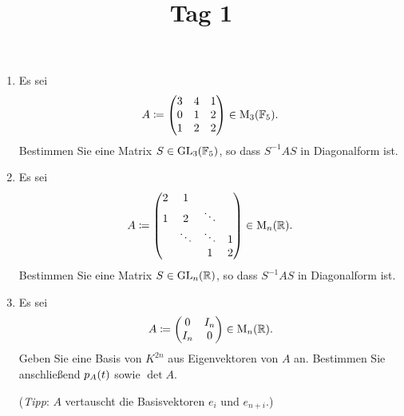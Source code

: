 \documentclass[a4paper, 10pt]{scrartcl}
\title{Tag 1}
\author{}
\date{}
\begin{document}
\begin{question}[subtitle = Diagonalisieren]
  \begin{enumerate}
    \item
      Es sei
      \[
                  A
        \coloneqq \begin{pmatrix}
                    3 & 4 & 1 \\
                    0 & 1 & 2 \\
                    1 & 2 & 2
                  \end{pmatrix}
        \in       \operatorname{M}_{3}(\mathbb{F}_5).
      \]
      Bestimmen Sie eine Matrix $S \in \operatorname{GL}_{3}(\mathbb{F}_5)$, so dass $S^{-1} A S$ in Diagonalform ist.
    \item
      Es sei
      \[
                  A
        \coloneqq \begin{pmatrix}
                    2 & 1       &         &   \\
                    1 & 2       & \ddots  &   \\
                      & \ddots  & \ddots  & 1 \\
                      &         & 1       & 2
                  \end{pmatrix}
        \in       \operatorname{M}_{n}(\mathbb{R}).
      \]
      Bestimmen Sie eine Matrix $S \in \operatorname{GL}_{n}(\mathbb{R})$, so dass $S^{-1} A S$ in Diagonalform ist.
    \item
      Es sei
      \[
                  A
        \coloneqq \begin{pmatrix}
                    0     & I_n \\
                    I_n & 0
                  \end{pmatrix}
        \in       \operatorname{M}_{n}(\mathbb{R}).
      \]
      Geben Sie eine Basis von $K^{2n}$ aus Eigenvektoren von $A$ an.
      Bestimmen Sie anschließend $p_{A}(t)$ sowie $\det A$.
      
      (\emph{Tipp}: $A$ vertauscht die Basisvektoren $e_i$ und $e_{n+i}$.)
  \end{enumerate}
\end{question}
\end{document}
